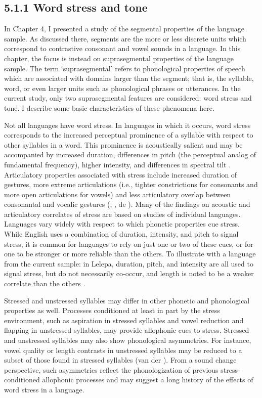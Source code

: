 \subsection{5.1.1 Word stress and tone}

  In Chapter 4, I presented a study of the segmental properties of the language sample. As discussed there, segments are the more or less discrete units which correspond to contrastive consonant and vowel sounds in a language. In this chapter, the focus is instead on suprasegmental properties of the language sample. The term ‘suprasegmental’ refers to phonological properties of speech which are associated with domains larger than the segment; that is, the syllable, word, or even larger units such as phonological phrases or utterances. In the current study, only two suprasegmental features are considered: word stress and tone. I describe some basic characteristics of these phenomena here.



  Not all languages have word stress. In languages in which it occurs, word stress corresponds to the increased perceptual prominence of a syllable with respect to other syllables in a word. This prominence is acoustically salient and may be accompanied by increased duration, differences in pitch (the perceptual analog of fundamental frequency), higher intensity, and differences in spectral tilt \citep{Gordon2011}. Articulatory properties associated with stress include increased duration of gestures, more extreme articulations (i.e., tighter constrictions for consonants and more open articulations for vowels) and less articulatory overlap between consonantal and vocalic gestures (\citealt{BeckmanEdwards1994}, \citealt{Fougeron1999}, de \citealt{JongEtAl1993}). Many of the findings on acoustic and articulatory correlates of stress are based on studies of individual languages. Languages vary widely with respect to which phonetic properties cue stress. While English uses a combination of duration, intensity, and pitch to signal stress, it is common for languages to rely on just one or two of these cues, or for one to be stronger or more reliable than the others. To illustrate with a language from the current sample: in Lelepa, duration, pitch, and intensity are all used to signal stress, but do not necessarily co-occur, and length is noted to be a weaker correlate than the others \citep[58]{Lacrampe2014}.



  Stressed and unstressed syllables may differ in other phonetic and phonological properties as well. Processes conditioned at least in part by the stress environment, such as aspiration in stressed syllables and vowel reduction and flapping in unstressed syllables, may provide allophonic cues to stress. Stressed and unstressed syllables may also show phonological asymmetries. For instance, vowel quality or length contrasts in unstressed syllables may be reduced to a subset of those found in stressed syllables (van der \citealt{Hulst2010}). From a sound change perspective, such asymmetries reflect the phonologization of previous stress-conditioned allophonic processes and may suggest a long history of the effects of word stress in a language.



